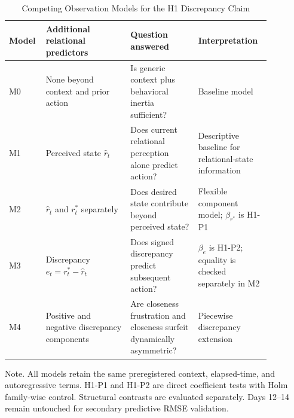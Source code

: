 \begin{table}[htbp]
\caption{Competing Observation Models for the H1 Discrepancy Claim}
\label{tab:h1-competing-models}
\centering
\small
\setlength{\tabcolsep}{3pt}
\renewcommand{\arraystretch}{0.95}
\begin{threeparttable}
\begin{tabular}{p{0.09\linewidth}p{0.30\linewidth}p{0.24\linewidth}p{0.24\linewidth}}
\toprule
Model & Additional relational predictors & Question answered & Interpretation \\
\midrule
M0 & None beyond context and prior action & Is generic context plus behavioral inertia sufficient? & Baseline model \\
M1 & Perceived state \(\hat r_t\) & Does current relational perception alone predict action? & Descriptive baseline for relational-state information \\
M2 & \(\hat r_t\) and \(r^\ast_t\) separately & Does desired state contribute beyond perceived state? & Flexible component model; \(\beta_{r^\ast}\) is H1-P1 \\
M3 & Discrepancy \(e_t=r^\ast_t-\hat r_t\) & Does signed discrepancy predict subsequent action? & \(\beta_e\) is H1-P2; equality is checked separately in M2 \\
M4 & Positive and negative discrepancy components & Are closeness frustration and closeness surfeit dynamically asymmetric? & Piecewise discrepancy extension \\
\bottomrule
\end{tabular}
\begin{tablenotes}[flushleft]
\footnotesize
\item Note. All models retain the same preregistered context, elapsed-time, and autoregressive terms. H1-P1 and H1-P2 are direct coefficient tests with Holm family-wise control. Structural contrasts are evaluated separately. Days 12--14 remain untouched for secondary predictive RMSE validation.
\end{tablenotes}
\end{threeparttable}
\end{table}
